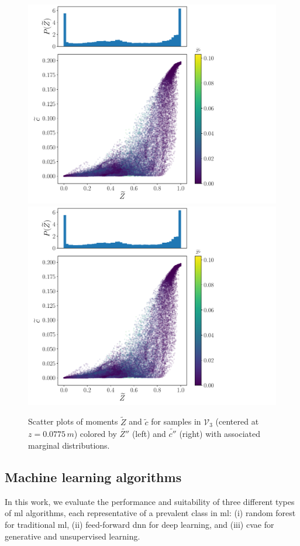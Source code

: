 \documentclass[review]{elsarticle}
\newcommand{\wt}[1]{\widetilde{#1}}
\begin{document}
\begin{figure}[!tbp]%
  \centering%
  \includegraphics[page=1, height=0.5\textwidth, trim=0.0cm 0cm 6.4cm 0cm, clip]{./figs/inputs_dice_0004.pdf}%
  \includegraphics[page=2, height=0.5\textwidth, trim=1.0cm 0cm 2.4cm 0cm, clip]{./figs/inputs_dice_0004.pdf}
  \caption{Scatter plots of moments $\wt{Z}$ and $\wt{c}$ for samples in $\mathcal{V}_3$ (centered at $z=0.0775\,\unit{m}$) colored by $\wt{Z''}$ (left) and $\wt{c''}$ (right) with associated marginal distributions.}\label{fig:inputs}%
\end{figure}%

\subsection{Machine learning algorithms}\label{sec:methods}
In this work, we evaluate the performance and suitability of three
different types of \gls{ml} algorithms, each representative of
a prevalent class in \gls{ml}: (i) random forest for
traditional \gls{ml}, (ii) feed-forward \gls{dnn} for deep
learning, and (iii) \gls{cvae} for generative and unsupervised
learning.
\end{document}

